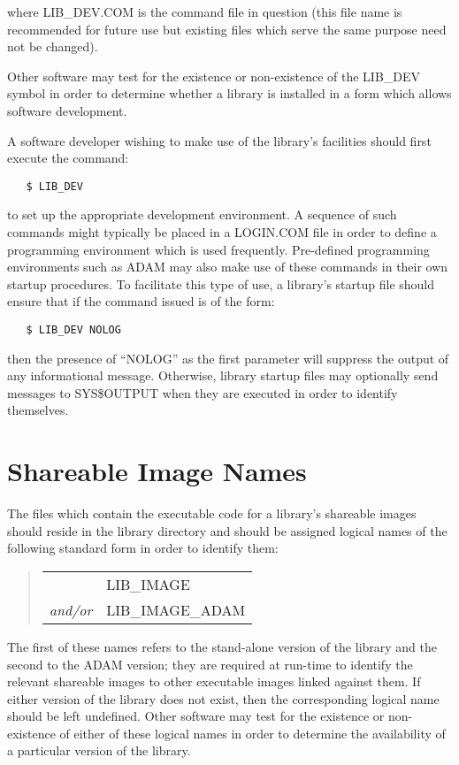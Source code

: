 where LIB\_DEV.COM is the command file in question (this file name is
recommended for future use but existing files which serve the same purpose
need not be changed).

Other software may test for the existence or non-existence of the LIB\_DEV
symbol in order to determine whether a library is installed in a form which
allows software development.

A software developer wishing to make use of the library's facilities should
first execute the command:

\begin{verbatim}
   $ LIB_DEV
\end{verbatim}

to set up the appropriate development environment.
A sequence of such commands might typically be placed in a LOGIN.COM file in
order to define a programming environment which is used frequently.
Pre-defined programming environments such as ADAM may also make use of these
commands in their own startup procedures.
To facilitate this type of use, a library's startup file should ensure that
if the command issued is of the form:

\begin{verbatim}
   $ LIB_DEV NOLOG
\end{verbatim}

then the presence of ``NOLOG'' as the first parameter will suppress the
output of any informational message.
Otherwise, library startup files may optionally send messages to SYS\$OUTPUT
when they are executed in order to identify themselves.

\section{Shareable Image Names}
\label{ss:imagenames}

The files which contain the executable code for a library's shareable
images should reside in the library directory and should be assigned logical
names of the following standard form in order to identify them:

\begin{quote}
\begin{tabular}{rl}
& LIB\_IMAGE\\
{\em and/or} & LIB\_IMAGE\_ADAM
\end{tabular}
\end{quote}

The first of these names refers to the stand-alone version of the library
and the second to the ADAM version; they are required at run-time to
identify the relevant shareable images to other executable images linked
against them.
If either version of the library does not exist, then the corresponding
logical name should be left undefined.
Other software may test for the existence or non-existence of either of these
logical names in order to determine the availability of a particular version
of the library.

